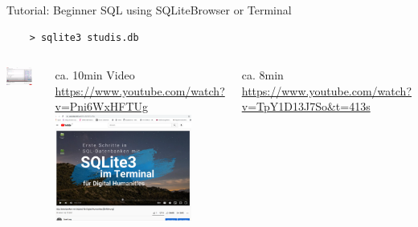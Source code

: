 \begin{frame}[fragile]{Tutorial: Beginner SQL using SQLiteBrowser or Terminal}
\small
\begin{verbatim}
    > sqlite3 studis.db
\end{verbatim}
 
\begin{columns}
\includegraphics[width=0.8\textwidth]{img/youtube-sqlitebrowser.png}

ca. 10min Video \\
\protect\url{https://www.youtube.com/watch?v=Pni6WxHFTUg} \\

\includegraphics[width=0.8\textwidth]{img/sql-basics-video-youtube.png}

ca. 8min \\
\protect\url{https://www.youtube.com/watch?v=TpY1D13J7So&t=413s} \\

\end{columns}
\end{frame}



